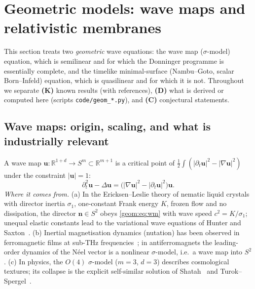 \section{Geometric models: wave maps and relativistic membranes}
\label{geom:sec}

This section treats two \emph{geometric} wave equations: the wave map
($\sigma$-model) equation, which is semilinear and for which the Donninger
programme is essentially complete, and the timelike minimal-surface
(Nambu--Goto, scalar Born--Infeld) equation, which is quasilinear and for
which it is not. Throughout we separate
\textbf{(K)} known results (with references),
\textbf{(D)} what is derived or computed here (scripts
\texttt{code/geom\_*.py}), and
\textbf{(C)} conjectural statements.

\subsection{Wave maps: origin, scaling, and what is industrially relevant}
\label{geom:sec:wm-origin}

A wave map $\bm u:\mathbb{R}^{1+d}\to S^m\subset\mathbb{R}^{m+1}$ is a
critical point of $\frac12\int(|\partial_t\bm u|^2-|\nabla\bm u|^2)$ under
the constraint $|\bm u|=1$:
\begin{equation}\label{geom:eq:wm}
  \partial_t^2\bm u-\Delta\bm u=\bigl(|\nabla\bm u|^2-|\partial_t\bm u|^2\bigr)\bm u .
\end{equation}
\emph{Where it comes from.} (a) In the Ericksen--Leslie theory of nematic
liquid crystals with director inertia $\sigma_1$, one-constant Frank energy
$K$, frozen flow and no dissipation, the director $\bm n\in S^2$ obeys
\eqref{geom:eq:wm} with wave speed $c^2=K/\sigma_1$; unequal elastic
constants lead to the variational wave equations of Hunter and
Saxton~\cite{HunterSaxton1991}. (b) Inertial magnetisation dynamics
(nutation) has been observed in ferromagnetic films at sub-THz
frequencies~\cite{NeerajEtAl2021}; in antiferromagnets the leading-order
dynamics of the N\'eel vector is a nonlinear $\sigma$-model, i.e.\ a wave map
into $S^2$. %
(c) In physics, the $O(4)$ $\sigma$-model ($m=3$, $d=3$) describes
cosmological textures; its collapse is the explicit self-similar solution of
Shatah~\cite{Shatah1988} and Turok--Spergel~\cite{TurokSpergel1990}.

